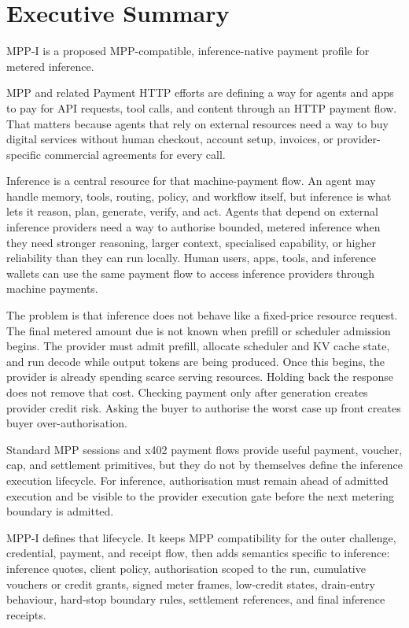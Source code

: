 \documentclass[11pt]{article}
\newcommand{\field}[1]{\texttt{\detokenize{#1}}}
\newcommand{\mppi}{MPP-I}
\begin{document}
\section*{Executive Summary}

MPP-I is a proposed MPP-compatible, inference-native payment profile for metered inference.

MPP and related Payment HTTP efforts are defining a way for agents and apps to pay for API requests, tool calls, and content through an HTTP payment flow. That matters because agents that rely on external resources need a way to buy digital services without human checkout, account setup, invoices, or provider-specific commercial agreements for every call.

Inference is a central resource for that machine-payment flow. An agent may handle memory, tools, routing, policy, and workflow itself, but inference is what lets it reason, plan, generate, verify, and act. Agents that depend on external inference providers need a way to authorise bounded, metered inference when they need stronger reasoning, larger context, specialised capability, or higher reliability than they can run locally. Human users, apps, tools, and inference wallets can use the same payment flow to access inference providers through machine payments.

The problem is that inference does not behave like a fixed-price resource request. The final metered amount due is not known when prefill or scheduler admission begins. The provider must admit prefill, allocate scheduler and KV cache state, and run decode while output tokens are being produced. Once this begins, the provider is already spending scarce serving resources. Holding back the response does not remove that cost. Checking payment only after generation creates provider credit risk. Asking the buyer to authorise the worst case up front creates buyer over-authorisation.

Standard MPP sessions and x402 payment flows provide useful payment, voucher, cap, and settlement primitives, but they do not by themselves define the inference execution lifecycle. For inference, authorisation must remain ahead of admitted execution and be visible to the provider execution gate before the next metering boundary is admitted.

\mppi{} defines that lifecycle. It keeps MPP compatibility for the outer \field{402} challenge, credential, payment, and receipt flow, then adds semantics specific to inference: inference quotes, client policy, authorisation scoped to the run, cumulative vouchers or credit grants, signed meter frames, low-credit states, drain-entry behaviour, hard-stop boundary rules, settlement references, and final inference receipts.
\end{document}

